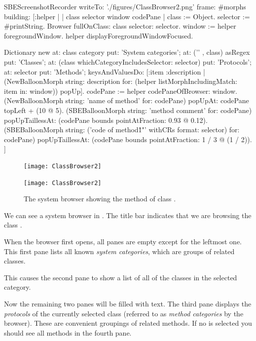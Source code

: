 \documentclass[a4paper,10pt,twoside]{book}
\begin{document}

\begin{ExecuteSmalltalkScript}
SBEScreenshotRecorder writeTo: './figures/ClassBrowser2.png' frame: #morphs building: [:helper |
	| class selector window codePane |
	class := Object. selector := #printString.
	Browser fullOnClass: class selector: selector.
	window := helper foregroundWindow.
	helper displayForegroundWindowFocused.

	Dictionary new
		at: class category put: 'System categories';
		at: ('\s*' , class) asRegex put: 'Classes';
		at: (class whichCategoryIncludesSelector: selector) put: 'Protocols';
		at: selector put: 'Methods';
		keysAndValuesDo: [:item :description |
			(NewBalloonMorph string: description for: (helper listMorphIncludingMatch: item in: window))
				popUp].
	codePane := helper codePaneOfBrowser: window.
	(NewBalloonMorph string: 'name of method' for: codePane)
			popUpAt: codePane topLeft + (10 @ 5).
	(SBEBalloonMorph string: 'method comment' for: codePane)
			popUpTaillessAt: (codePane bounds pointAtFraction: 0.93 @ 0.12).
	(SBEBalloonMorph
		string: ('code of method\"{1}"' withCRs format: {selector})
		for: codePane)
			popUpTaillessAt: (codePane bounds pointAtFraction: 1 / 3 @ (1 / 2)).
]
\end{ExecuteSmalltalkScript}
\begin{figure}[htb]
\ifluluelse
	{\centerline {\texttt{[image: ClassBrowser2]}}}
	{\centerline {\texttt{[image: ClassBrowser2]}}}
\caption{The system browser showing the  method of class .
\label{fig:classBrowser}}
\end{figure}

We can see a system browser in .
The title bar indicates that we are browsing the class .

When the browser first opens, all panes are empty except for the leftmost one.
This first pane lists all known \emph{system categories}, which are groups of related classes.

This causes the second pane to show a list of all of the classes in the selected category.

Now the remaining two panes will be filled with text.
The third pane displays the \emph{protocols} of the currently selected class (referred to as \emph{method categories} by the browser).
These are convenient groupings of related methods.
If no  is selected you should see all methods in the fourth pane.
\end{document}
